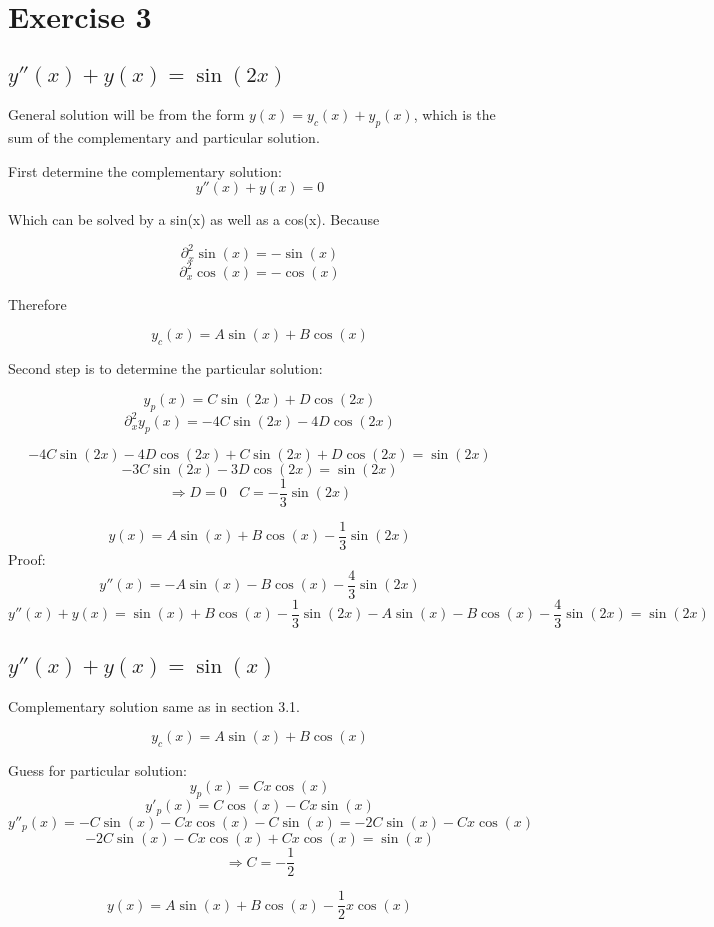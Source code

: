 \documentclass[11pt]{article}
\begin{document}
\section{Exercise 3}

\subsection{$ y''(x) + y(x) = \sin(2x) $}

General solution will be from the form $y(x) = y_c(x) + y_p(x)$, which is the sum of the complementary and particular solution.

First determine the complementary solution: 
\[ y''(x) + y(x) = 0 \]

Which can be solved by a sin(x) as well as a cos(x). Because 

\[  \partial^2_x \sin(x) = -\sin(x)  \]
\[  \partial^2_x \cos(x) = -\cos(x)  \]

Therefore

\[ y_c(x) = A\sin(x) + B\cos(x) \]

Second step is to determine the particular solution:

\[ y_p(x) = C\sin(2x) + D\cos(2x) \]
\[ \partial^2_x y_p(x) = -4C\sin(2x) -4D\cos(2x) \]

\[ -4C\sin(2x) -4D\cos(2x) + C\sin(2x) + D\cos(2x) = \sin(2x) \]
\[ -3C\sin(2x) - 3D\cos(2x) = \sin(2x) \]
\[ \Rightarrow D = 0 ~~~~ C = -\frac{1}{3}\sin(2x) \]

\[\boxed{ y(x) = A\sin(x) + B\cos(x) -\frac{1}{3}\sin(2x) }\]
Proof:
\[ y''(x) = -A\sin(x) - B\cos(x) -\frac{4}{3} \sin(2x)\]
\[ y''(x) + y(x) = \sin(x) + B\cos(x) -\frac{1}{3}\sin(2x) -A\sin(x) - B\cos(x) -\frac{4}{3} \sin(2x) = \sin(2x) \]

\subsection{$ y''(x) + y(x) = \sin(x) $}

Complementary solution same as in section 3.1.

\[ y_c(x) = A\sin(x) + B\cos(x) \]

Guess for particular solution:
\[ y_p(x) = C x \cos(x)\]
\[ y'_p(x) = C \cos(x) - C x \sin(x) \]
\[ y''_p(x) = - C \sin(x) - C x \cos(x) - C \sin(x) = -2 C \sin(x) - C x \cos(x) \]
\[ -2 C \sin(x) - C x \cos(x) + C x \cos(x) = \sin(x) \]
\[ \Rightarrow C = -\frac{1}{2} \]

\[\boxed{ y(x) = A\sin(x) + B\cos(x) -\frac{1}{2}x\cos(x) }\]
\end{document}
